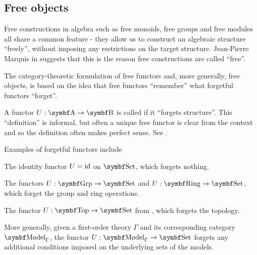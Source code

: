 \subsection{Free objects}\label{subsec:free_objects}

\begin{remark}\label{remark:free_construction_etymology}
  Free constructions in algebra such as free monoids, free groups and free modules all share a common feature - they allow us to construct an algebraic structure \enquote{freely}, without imposing any restrictions on the target structure. Jean-Pierre Marquis in \cite{StanfordPlato:category_theory} suggests that this is the reason free constructions are called \enquote{free}.

  The category-theoretic formulation of free functors and, more generally, free objects, is based on the idea that free functors \enquote{remember} what forgetful functors \enquote{forget}.
\end{remark}

\begin{definition}\label{def:forgetful_functor}\cite[examples 1.2.3]{Leinster2014}
  A functor \( U: \Cat{A} \to \Cat{B} \) is called  if it \enquote{forgets structure}. This \enquote{definition} is informal, but often a unique free functor is clear from the context and so the definition often makes perfect sense. See .
\end{definition}

\begin{example}\label{ex:forgetful_functors}
  Examples of forgetful functors include

  \begin{defenum}
    \item The identity functor \( U = \operatorname{id} \) on \( \Cat{Set} \), which forgets nothing.
    \item The functors \( U: \Cat{Grp} \to \Cat{Set} \) and \( U: \Cat{Ring} \to \Cat{Set} \), which forget the group and ring operations.
    \item The functor \( U: \Cat{Top} \to \Cat{Set} \) from , which forgets the topology.
    \item More generally, given a first-order theory \( \Gamma \) and its corresponding category \( \Cat{Model}_\Gamma \), the functor \( U: \Cat{Model}_\Gamma \to \Cat{Set} \) forgets any additional conditions imposed on the underlying sets of the models.
  \end{defenum}
\end{example}

